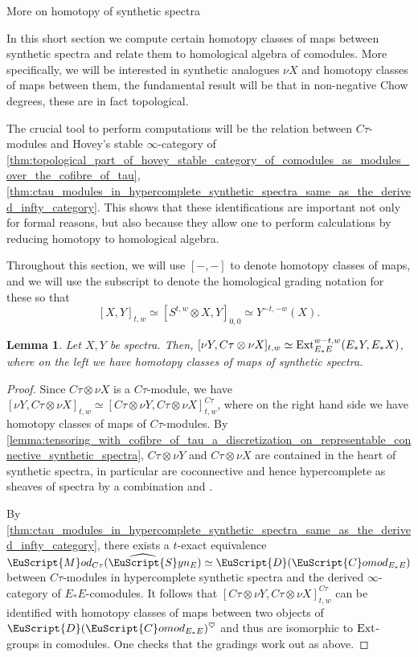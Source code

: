 \documentclass[oneside,a4paper]{amsart}
\makeatletter
\newcommand{\euscr}[1]{\EuScript{#1}} %
\newcommand{\dcat}{\euscr{D}} %
\newcommand{\Ext}{\textnormal{Ext}} %
\newcommand{\hpsynspectra}{\widehat{\euscr{S}}yn} %
\newcommand{\Comod}{\euscr{C}omod} %
\newcommand{\ComodE}{\Comod_{E_{*}E}} %
\newcommand{\Mod}{\euscr{M}od} %
\theoremstyle{plain}
\newtheorem{lemma}[thm]{Lemma}
\theoremstyle{definition}
\theoremstyle{remark}
\def\subsection{\@startsection{subsection}{1}%
  \z@{.7\linespacing\@plus\linespacing}{.5\linespacing}%
  {\normalfont\bfseries\centering}}%
\makeatother
\begin{document}
\subsection{More on homotopy of synthetic spectra}

In this short section we compute certain homotopy classes of maps between synthetic spectra and relate them to homological algebra of comodules. More specifically, we will be interested in synthetic analogues $\nu X$ and homotopy classes of maps between them, the fundamental result will be that in non-negative Chow degrees, these are in fact topological.

The crucial tool to perform computations will be the relation between $C\tau$-modules and Hovey's stable $\infty$-category of \cref{thm:topological_part_of_hovey_stable_category_of_comodules_as_modules_over_the_cofibre_of_tau}, \cref{thm:ctau_modules_in_hypercomplete_synthetic_spectra_same_as_the_derived_infty_category}. This shows that these identifications are important not only for formal reasons, but also because they allow one to perform calculations by reducing homotopy to homological algebra.

Throughout this section, we will use $[-, -]$ to denote homotopy classes of maps, and we will use the subscript to denote the homological grading notation for these so that 
\[
[X, Y]_{t, w} \simeq [S^{t, w} \otimes X, Y]_{0, 0} \simeq Y^{-t, -w}(X).
\]

\begin{lemma}
\label{lemma:maps_from_synthetic_analogue_to_synthetic_analogue_tensor_ctau_compute_ext_groups_in_comodules}
Let $X, Y$ be spectra. Then, $[\nu Y, C\tau \otimes \nu X]_{t, w} \simeq \Ext_{E_{*}E}^{w-t, w}(E_{*}Y, E_{*}X)$, where on the left we have homotopy classes of maps of synthetic spectra. 
\end{lemma}

\begin{proof}
Since $C\tau \otimes \nu X$ is a $C\tau$-module, we have $[\nu Y, C\tau \otimes \nu X]_{t, w} \simeq [C\tau \otimes \nu Y, C\tau \otimes \nu X]^{C\tau}_{t, w}$, where on the right hand side we have homotopy classes of maps of $C\tau$-modules.  By \cref{lemma:tensoring_with_cofibre_of_tau_a_discretization_on_representable_connective_synthetic_spectra}, $C\tau \otimes \nu Y$ and $C\tau \otimes \nu X$ are contained in the heart of synthetic spectra, in particular are coconnective and hence hypercomplete as sheaves of spectra by a combination  \cite[1.3.3.3, (1)]{lurie_spectral_algebraic_geometry} and  \cite[6.5.2.9]{lurie_higher_topos_theory}. 

By \cref{thm:ctau_modules_in_hypercomplete_synthetic_spectra_same_as_the_derived_infty_category}, there exists a $t$-exact equivalence $\Mod_{C\tau}(\hpsynspectra_{E}) \simeq \dcat(\ComodE)$ between $C\tau$-modules in hypercomplete synthetic spectra and the derived $\infty$-category of $E_{*}E$-comodules. It follows that $[C\tau \otimes \nu Y, C\tau \otimes \nu X]^{C\tau}_{t, w}$ can be identified with homotopy classes of maps between two objects of $\dcat(\ComodE)^{\heartsuit}$ and thus are isomorphic to $\Ext$-groups in comodules.  One checks that the gradings work out as above. 
\end{proof}
\end{document}
